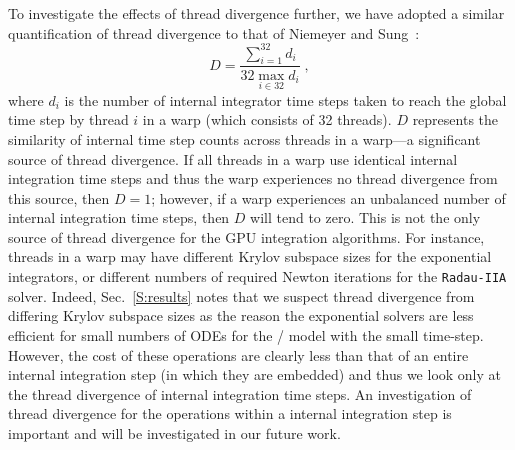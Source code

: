 \documentclass[final,twocolumn]{elsarticle}
\begin{document}
To investigate the effects of thread divergence further, we have adopted a similar quantification of thread divergence to that of Niemeyer and Sung~\cite{Niemeyer:2014aa}:
\begin{equation}
	D = \frac{\sum_{i=1}^{32}{d_i}}{32 \max_{i \in 32} d_i} \;,
	\label{eqn:divergence}
\end{equation}
where $d_i$ is the number of internal integrator time steps taken to reach the global time step by thread $i$ in a warp (which consists of 32 threads).
$D$ represents the similarity of internal time step counts across threads in a warp---a significant source of thread divergence.
If all threads in a warp use identical internal integration time steps and thus the warp experiences no thread divergence from this source, then $D = 1$; however, if a warp experiences an unbalanced number of internal integration time steps, then $D$ will tend to zero.
This is not the only source of thread divergence for the GPU integration algorithms.
For instance, threads in a warp may have different Krylov subspace sizes for the exponential integrators, or different numbers of required Newton iterations for the \texttt{Radau-IIA} solver.
Indeed, Sec.~\ref{S:results} notes that we suspect thread divergence from differing Krylov subspace sizes as the reason the exponential solvers are less efficient for small numbers of ODEs for the \slash{} model with the small time-step.
However, the cost of these operations are clearly less than that of an entire internal integration step (in which they are embedded) and thus we look only at the thread divergence of internal integration time steps.
An investigation of thread divergence for the operations within a internal integration step is important and will be investigated in our future work.
\end{document}
